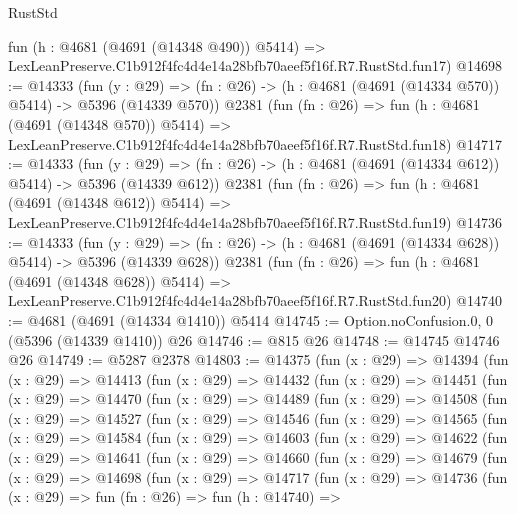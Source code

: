 \begin{lexlean}{RustStd}
\begin{coremodule}
    fun (h : @4681 (@4691 (@14348 @490)) @5414) =>
    LexLeanPreserve.C1b912f4fc4d4e14a28bfb70aeef5f16f.R7.RustStd.fun17)
@14698 := @14333
    (fun (y : @29) => (fn : @26) -> (h : @4681 (@4691 (@14334 @570)) @5414) -> @5396 (@14339 @570))
    @2381
    (fun (fn : @26) =>
    fun (h : @4681 (@4691 (@14348 @570)) @5414) =>
    LexLeanPreserve.C1b912f4fc4d4e14a28bfb70aeef5f16f.R7.RustStd.fun18)
@14717 := @14333
    (fun (y : @29) => (fn : @26) -> (h : @4681 (@4691 (@14334 @612)) @5414) -> @5396 (@14339 @612))
    @2381
    (fun (fn : @26) =>
    fun (h : @4681 (@4691 (@14348 @612)) @5414) =>
    LexLeanPreserve.C1b912f4fc4d4e14a28bfb70aeef5f16f.R7.RustStd.fun19)
@14736 := @14333
    (fun (y : @29) => (fn : @26) -> (h : @4681 (@4691 (@14334 @628)) @5414) -> @5396 (@14339 @628))
    @2381
    (fun (fn : @26) =>
    fun (h : @4681 (@4691 (@14348 @628)) @5414) =>
    LexLeanPreserve.C1b912f4fc4d4e14a28bfb70aeef5f16f.R7.RustStd.fun20)
@14740 := @4681 (@4691 (@14334 @1410)) @5414
@14745 := Option.noConfusion.{0, 0} (@5396 (@14339 @1410)) @26
@14746 := @815 @26
@14748 := @14745 @14746 @26
@14749 := @5287 @2378
@14803 := @14375
    (fun (x : @29) =>
    @14394
      (fun (x : @29) =>
      @14413
        (fun (x : @29) =>
        @14432
          (fun (x : @29) =>
          @14451
            (fun (x : @29) =>
            @14470
              (fun (x : @29) =>
              @14489
                (fun (x : @29) =>
                @14508
                  (fun (x : @29) =>
                  @14527
                    (fun (x : @29) =>
                    @14546
                      (fun (x : @29) =>
                      @14565
                        (fun (x : @29) =>
                        @14584
                          (fun (x : @29) =>
                          @14603
                            (fun (x : @29) =>
                            @14622
                              (fun (x : @29) =>
                              @14641
                                (fun (x : @29) =>
                                @14660
                                  (fun (x : @29) =>
                                  @14679
                                    (fun (x : @29) =>
                                    @14698
                                      (fun (x : @29) =>
                                      @14717
                                        (fun (x : @29) =>
                                        @14736
                                          (fun (x : @29) =>
                                          fun (fn : @26) =>
                                          fun (h : @14740) =>

\end{coremodule}
\end{lexlean}
